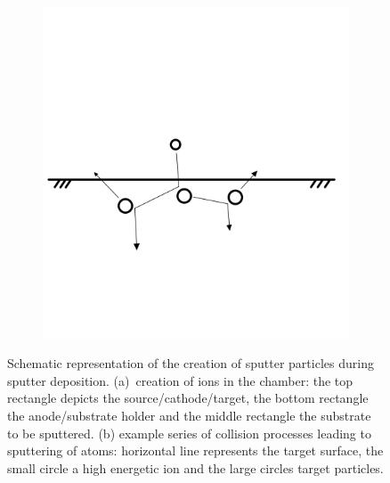 \begin{figure}[tbh]
\begin{subfigure}[t]{.3\textwidth}
        \includegraphics[width=\textwidth]{./Pics/sputter2.png}
        \caption{}
        \label{fig:sputter1}
    \end{subfigure}
    \caption{Schematic representation of the creation of sputter particles during sputter deposition. 
    (a)~creation of ions in the chamber: 
        the top rectangle depicts the source/cathode/target, 
        the bottom rectangle the anode/substrate holder and 
        the middle rectangle the substrate to be sputtered. 
    (b) example series of collision processes leading to sputtering of atoms: 
        horizontal line represents the target surface, 
        the small circle a high energetic ion and 
        the large circles target particles. 
    }
	\label{fig:sputter}
\end{figure}

